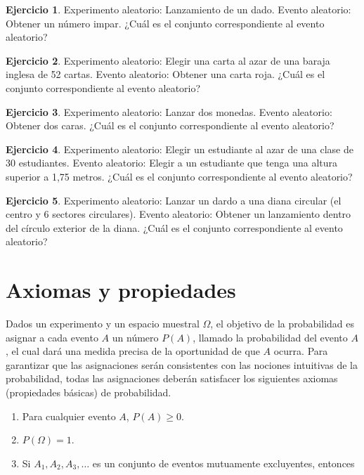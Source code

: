 \documentclass[
  11pt,
]{book}
\theoremstyle{definition}
\theoremstyle{definition}
\theoremstyle{definition}
\newtheorem{exercise}{Ejercicio}[chapter]
\theoremstyle{definition}
\theoremstyle{remark}
\begin{document}
\begin{exercise}
Experimento aleatorio: Lanzamiento de un dado. Evento aleatorio: Obtener un número impar. ¿Cuál es el conjunto correspondiente al evento aleatorio?
\end{exercise}

\begin{exercise}
Experimento aleatorio: Elegir una carta al azar de una baraja inglesa de 52 cartas. Evento aleatorio: Obtener una carta roja. ¿Cuál es el conjunto correspondiente al evento aleatorio?
\end{exercise}

\begin{exercise}
Experimento aleatorio: Lanzar dos monedas. Evento aleatorio: Obtener dos caras. ¿Cuál es el conjunto correspondiente al evento aleatorio?
\end{exercise}

\begin{exercise}
Experimento aleatorio: Elegir un estudiante al azar de una clase de 30 estudiantes. Evento aleatorio: Elegir a un estudiante que tenga una altura superior a 1,75 metros. ¿Cuál es el conjunto correspondiente al evento aleatorio?
\end{exercise}

\begin{exercise}
Experimento aleatorio: Lanzar un dardo a una diana circular (el centro y 6 sectores circulares). Evento aleatorio: Obtener un lanzamiento dentro del círculo exterior de la diana. ¿Cuál es el conjunto correspondiente al evento aleatorio?
\end{exercise}

\section{Axiomas y propiedades}\label{probabilidad-variables-elementos-axiomas}

Dados un experimento y un espacio muestral \(\Omega\), el objetivo de la probabilidad es asignar a cada evento \(A\) un número \(P(A)\), llamado la probabilidad del evento \(A\), el cual dará una medida precisa de la oportunidad de que \(A\) ocurra. Para garantizar que las asignaciones serán consistentes con las nociones intuitivas de la probabilidad, todas las asignaciones deberán satisfacer los siguientes axiomas (propiedades básicas) de probabilidad.

\begin{enumerate}
\def\labelenumi{\arabic{enumi}.}
\item
  Para cualquier evento \(A\), \(P(A) \geq 0\).
\item
  \(P(\Omega) = 1\).
\item
  Si \(A_{1}, A_{2}, A_{3}, \ldots\) es un conjunto de eventos mutuamente excluyentes, entonces
\end{enumerate}
\end{document}

